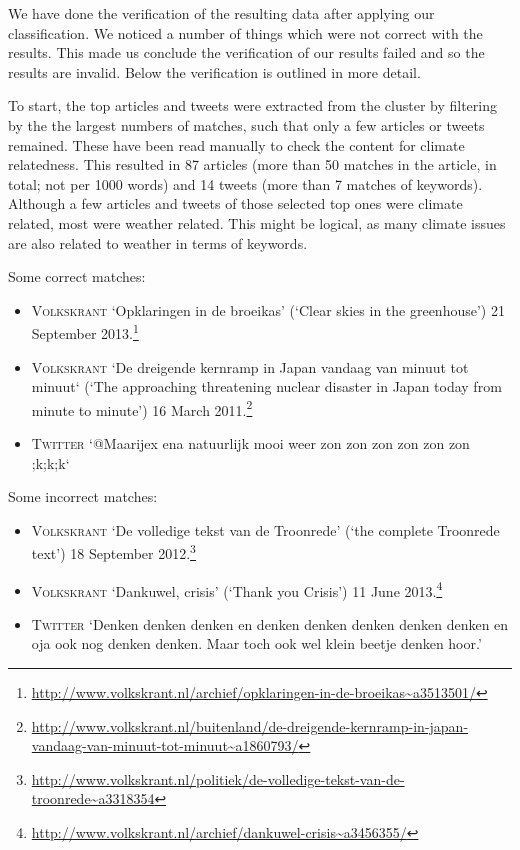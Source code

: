 \documentclass[paper=a4, fontsize=9px]{scrartcl} %
\numberwithin{equation}{section} %
\numberwithin{figure}{section} %
\numberwithin{table}{section} %
\begin{document}
\begin{multicols}{2}
We have done the verification of the resulting data after applying our classification. We noticed a number of things which were not correct with the results. This made us conclude the verification of our results failed and so the results are invalid. Below the verification is outlined in more detail.

To start, the top articles and tweets were extracted from the cluster by filtering by the the largest numbers of matches, such that only a few articles or tweets remained. These have been read manually to check the content for climate relatedness. This resulted in 87 articles (more than 50 matches in the article, in total; not per 1000 words) and 14 tweets (more than 7 matches of keywords). Although a few articles and tweets of those selected top ones were climate related, most were weather related. This might be logical, as many climate issues are also related to weather in terms of keywords.

Some correct matches: 
\begin{itemize}
	\item \textsc{Volkskrant} `Opklaringen in de broeikas’ (`Clear skies in the greenhouse’) 21 September 2013.\footnote{\url{http://www.volkskrant.nl/archief/opklaringen-in-de-broeikas~a3513501/}}
	\item \textsc{Volkskrant} `De dreigende kernramp in Japan vandaag van minuut tot minuut` (`The approaching threatening nuclear disaster in Japan today from minute to minute’) 16 March 2011.\footnote{\url{http://www.volkskrant.nl/buitenland/de-dreigende-kernramp-in-japan-vandaag-van-minuut-tot-minuut~a1860793/}}
	\item \textsc{Twitter} `@Maarijex  ena natuurlijk mooi weer zon zon zon zon zon zon ;k;k;k`
\end{itemize}

Some incorrect matches:
\begin{itemize}
	\item \textsc{Volkskrant} `De volledige tekst van de Troonrede’ (`the complete Troonrede text’) 18 September 2012.\footnote{\url{http://www.volkskrant.nl/politiek/de-volledige-tekst-van-de-troonrede~a3318354}}
	\item \textsc{Volkskrant} `Dankuwel, crisis’ (`Thank you Crisis’) 11 June 2013.\footnote{\url{http://www.volkskrant.nl/archief/dankuwel-crisis~a3456355/}}
	\item \textsc{Twitter} `Denken denken denken en denken denken denken denken denken en oja ook nog denken denken. Maar toch ook wel klein beetje denken hoor.’


\end{itemize}
\end{multicols}
\end{document}
